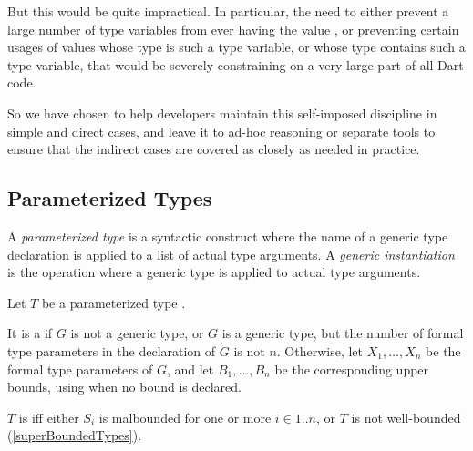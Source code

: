 \documentclass[makeidx]{article}
\begin{document}
{{But this would be quite impractical.
In particular, the need to either prevent a large number of type variables
from ever having the value \VOID,
or preventing certain usages of values whose type is such a type variable,
or whose type contains such a type variable,
that would be severely constraining on a very large part of all Dart code.

So we have chosen to help developers maintain this self-imposed discipline
in simple and direct cases,
and leave it to ad-hoc reasoning or separate tools to ensure
that the indirect cases are covered as closely as needed in practice.%
}


\subsection{Parameterized Types}


\LMHash{}%
A \emph{parameterized type} is a syntactic construct
where the name of a generic type declaration is applied to
a list of actual type arguments.
A \emph{generic instantiation} is the operation where
a generic type is applied to actual type arguments.


\LMHash{}%
Let $T$ be a parameterized type .

\LMHash{}%
It is a  if $G$ is not a generic type,
or $G$ is a generic type,
but the number of formal type parameters in the declaration of $G$ is not $n$.
Otherwise, let
$X_1, \ldots, X_n$
be the formal type parameters of $G$, and let
$B_1, \ldots, B_n$
be the corresponding upper bounds, using \DYNAMIC{} when no bound is declared.

\LMHash{}%
$T$ is  if{}f either
$S_i$ is malbounded for one or more $i \in 1 .. n$,
or $T$ is not well-bounded (\ref{superBoundedTypes}).

}
\end{document}
